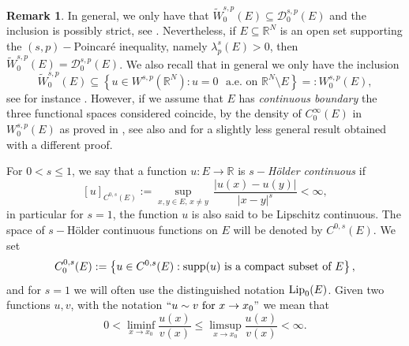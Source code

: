 \documentclass{amsart}
\theoremstyle{definition}
\newtheorem{remark}[theorem]{Remark}
\numberwithin{equation}{section}
\begin{document}

	
	\begin{remark}
		In general, we only have that $\widetilde{W}^{s,p}_0(E) \subseteq \mathcal{D}^{s,p}_0(E)$ and the inclusion is possibly strict, see \cite[Remark 3.2]{BGV}. Nevertheless, if $E \subseteq \mathbb{R}^N$ is an open set supporting the $(s,p)-$Poincar\'e inequality, namely $\lambda_{p}^s(E) > 0$, then $\widetilde{W}^{s,p}_0(E) = \mathcal{D}^{s,p}_0(E)$. We also recall that in general we only have the inclusion
		\[
		\widetilde{W}_0^{s,p}(E) \subseteq \left\{u \in W^{s,p}(\mathbb{R}^N) : u = 0 \,\,\mbox{ a.e. on } \mathbb{R}^N \setminus E\right\} =: W^{s,p}_0(E),
		\]
		see for instance  \cite[Remark 7]{FSV}. However, if we assume that $E$ has {\it continuous boundary} the three functional spaces considered coincide, by the density of $C^\infty_0(E)$ in $W^{s,p}_0(E)$ as proved in \cite[Theorem 6]{FSV}, see also \cite[Theorem 1.4.2.2]{Grisvard_book} and \cite[Proposition B.1]{BPS} for a slightly less general result obtained with a different proof.
	\end{remark}
	
	\par 
	For $0 < s \le 1$, we say that a function $u : E \to \mathbb{R}$ is {\it $s-$H\"older continuous} if
	\[
	[u]_{C^{0,s}(E)} := \sup_{x,y \in E,\,x \neq y}\, \frac{|u(x) - u(y)|}{|x-y|^s} < \infty,
	\]
	in particular for $s = 1$, the function $u$ is also said to be Lipschitz continuous. The space of $s-$H\"older continuous functions on $E$ will be denoted by $C^{0,s}(E)$. We set  
	\[
	C^{0,s}_0(E) :=\left\{u \in C^{0, s}(E) : {\rm supp}(u) \mbox{ is a compact subset of } E\right\},
	\]
	and for $s = 1$ we will often use the distinguished notation ${\rm Lip}_0(E)$. Given two functions $u, v$, with the notation $``u \sim v \mbox{ for } x \to x_0"$ we mean that 
	\[
	0 < \liminf_{x \to x_0} \frac{u(x)}{v(x)} \le \limsup_{x \to x_0} \frac{u(x)}{v(x)} < \infty.  
	\] 
	
\end{document}
